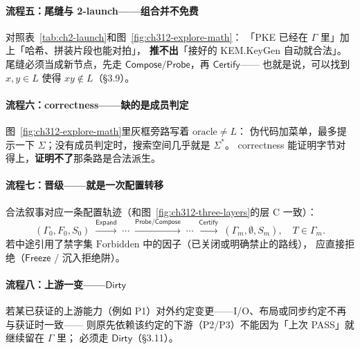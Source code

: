 \documentclass[UTF8,a4paper,11pt]{ctexart}
\theoremstyle{definition}
\theoremstyle{plain}
\theoremstyle{remark}
\numberwithin{figure}{section}
\numberwithin{table}{section}
\begin{document}
\paragraph{流程五：尾缝与 2-launch——组合并不免费}
对照表~\ref{tab:ch2-launch}和图~\ref{fig:ch312-explore-math}：
「PKE 已经在 $\Gamma$ 里」加上「哈希、拼装片段也能对拍」，
\textbf{推不出}「接好的 KEM.KeyGen 自动就合法」。
尾缝必须当成新节点，先走 $\mathsf{Compose}/\mathsf{Probe}$，再 $\mathsf{Certify}$——
也就是说，可以找到 $x,y\in L$ 使得 $xy\notin L$（§3.9）。

\paragraph{流程六：correctness——缺的是成员判定}
图~\ref{fig:ch312-explore-math}里灰框旁路写着 $\mathrm{oracle}\neq L$：
伪代码加菜单，最多提示一下 $\Sigma$；没有成员判定时，搜索空间几乎就是 $\Sigma^*$。
correctness 能证明字节对得上，\textbf{证明不了}那条路是合法派生。

\paragraph{流程七：晋级——就是一次配置转移}
合法叙事对应一条配置轨迹（和图~\ref{fig:ch312-three-layers}的层 C 一致）：
\[
(\Gamma_0,F_0,S_0)
\;\xrightarrow{\mathsf{Expand}}\;
\cdots
\;\xrightarrow{\mathsf{Probe}/\mathsf{Compose}}\;
\cdots
\;\xrightarrow{\mathsf{Certify}}\;
(\Gamma_m,\emptyset,S_m),
\quad T\in\Gamma_m.
\]
若中途引用了禁字集 $\mathrm{Forbidden}$ 中的因子（已关闭或明确禁止的路线），
应直接拒绝（$\mathsf{Freeze}$ / 沉入拒绝阱）。

\paragraph{流程八：上游一变——$\mathsf{Dirty}$}
若某已获证的上游能力（例如 P1）对外约定变更——I/O、布局或同步约定不再与获证时一致——
则原先依赖该约定的下游（P2/P3）不能因为「上次 PASS」就继续留在 $\Gamma$ 里；
必须走 $\mathsf{Dirty}$（§3.11）。
\end{document}
